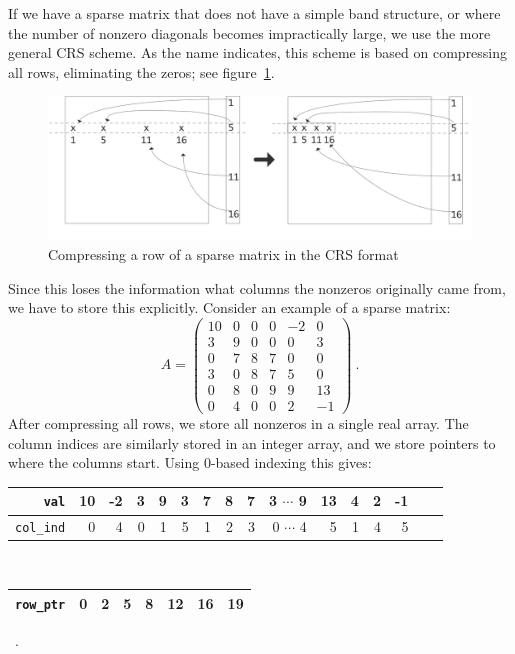 If we have a sparse matrix that does not have a simple band structure,
or where the number of nonzero diagonals becomes impractically large,
we use the more general \acf{CRS} scheme. As the name indicates, this
scheme is based on compressing all rows, eliminating the zeros; see
figure~\ref{fig:crs}.
\begin{figure}[ht]
  \includegraphics[scale=.13]{graphics-public/crs}
  \caption{Compressing a row of a sparse matrix in the CRS format}
  \label{fig:crs}
\end{figure}
Since this loses the information what columns the nonzeros originally
came from, we have to store this explicitly.
Consider an example of a sparse matrix:
\begin{equation}
A =
\left(\begin{array}{rrrrrr}
      10 &  0 &  0 & 0  &-2 &  0 \\
       3 &  9 &  0 & 0  & 0 &  3 \\
       0 &  7 &  8 & 7  & 0 &  0 \\
       3 &  0 &  8 & 7  & 5 &  0 \\
       0 &  8 &  0 & 9  & 9 & 13 \\
       0 &  4 &  0 & 0  & 2 & -1
           \end{array}
\right) ~.
\end{equation}
After compressing all rows, we store all
nonzeros in a single real array. The column indices are
similarly stored in an integer array, and we store pointers to where
the columns start. Using 0-based indexing this gives:
\begin{center}
\begin{tabular}{|r|r|r|r|r|r|r|r|r|r|r|r|r|r|r|r|} \hline
{\tt val}     &10 &-2& 3& 9& 3& 7& 8& 7& 3 $\cdots$  9&13& 4& 2&-1 \\ \hline
{\tt col\_ind}& 0 & 4& 0& 1& 5& 1& 2& 3& 0 $\cdots$  4& 5& 1& 4& 5 \\ \hline
\end{tabular} \\
\vspace{.02 in}
\begin{tabular}{|r|r|r|r|r|r|r|r|} \hline
{\tt row\_ptr}& 0 & 2 & 5 & 8 & 12 & 16 & 19  \\ \hline
\end{tabular} ~.
\end{center}
